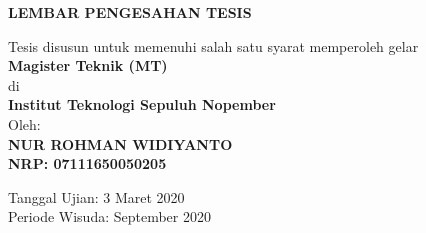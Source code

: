 \AddToShipoutPicture*{\BackgroundImage}

\begin{center}
	\Large\textbf{LEMBAR PENGESAHAN TESIS}
\end{center}

\begin{center}
	Tesis disusun untuk memenuhi salah satu syarat memperoleh gelar\\
	\textbf{Magister Teknik (MT)}\\
	di\\
	\textbf{Institut Teknologi Sepuluh Nopember}\\
	Oleh:\\
	\textbf{NUR ROHMAN WIDIYANTO}\\
	\textbf{NRP: 07111650050205}
\end{center}

\begin{center}
	Tanggal Ujian: 3 Maret 2020\\
	Periode Wisuda: September 2020
\end{center}

